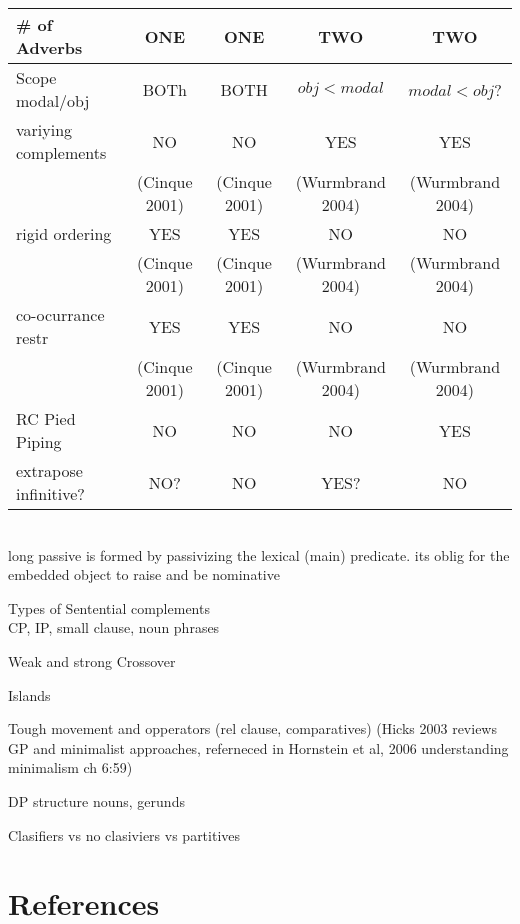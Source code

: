 \documentclass{article}
\begin{document}
\begin{example}
\begin{tabular}{|l|c|c|c|c|}
\# of Adverbs & ONE & ONE & TWO & TWO \\\hline
Scope modal/obj & BOTh & BOTH &$ obj<modal$ &$ modal<obj$?\\\hline
variying complements & NO & NO & YES & YES \\
& (Cinque 2001)& (Cinque 2001) & (Wurmbrand 2004)& (Wurmbrand 2004)\\\hline
rigid ordering & YES & YES & NO & NO\\
& (Cinque 2001)& (Cinque 2001) & (Wurmbrand 2004)& (Wurmbrand 2004)\\\hline
co-ocurrance restr &  YES & YES & NO & NO\\
& (Cinque 2001)& (Cinque 2001) & (Wurmbrand 2004)& (Wurmbrand 2004)\\\hline
RC Pied Piping & NO & NO & NO & YES \\\hline	
extrapose infinitive? & NO? & NO & YES? &NO \\\hline
\end{tabular}\\
long passive is formed by passivizing the lexical (main) predicate. its oblig for the embedded object to raise and be nominative
\end{example}

\begin{example}
Types of Sentential complements\\
CP, IP, small clause, noun phrases
\end{example}

\begin{example}Weak and strong Crossover
\end{example}

\begin{example}Islands
\end{example}

\begin{example}Tough movement and opperators (rel clause, comparatives) (Hicks 2003 reviews GP and minimalist approaches, referneced in Hornstein et al, 2006 understanding minimalism ch 6:59)
\end{example}

\begin{example}DP structure
nouns, gerunds
\end{example}

\begin{example}Clasifiers vs no clasiviers vs partitives
\end{example}

\section*{References}
\end{document}

